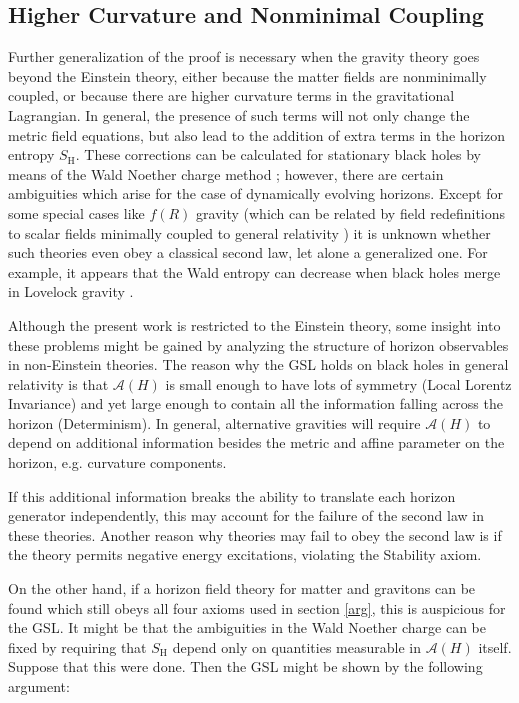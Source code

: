 \documentclass[12pt]{article}
\begin{document}
\subsection{Higher Curvature and Nonminimal Coupling}\label{nonmin}

Further generalization of the proof is necessary when the gravity theory goes beyond the Einstein theory, either because the matter fields are nonminimally coupled, or because there are higher curvature terms in the gravitational Lagrangian.  In general, the presence of such terms will not only change the metric field equations, but also lead to the addition of extra terms in the horizon entropy $S_\mathrm{H}$.  These corrections can be calculated for stationary black holes by means of the Wald Noether charge method \cite{WI94}; however, there are certain ambiguities which arise for the case of dynamically evolving horizons.  Except for some special cases like $f(R)$ gravity (which can be related by field redefinitions to scalar fields minimally coupled to general relativity \cite{2ndlaw}) it is unknown whether such theories even obey a classical second law, let alone a generalized one.  For example, it appears that the Wald entropy can decrease when black holes merge in Lovelock gravity \cite{lovelock}.

Although the present work is restricted to the Einstein theory, some insight into these problems might be gained by analyzing the structure of horizon observables in non-Einstein theories.  The reason why the GSL holds on black holes in general relativity is that $\mathcal{A}(H)$ is small enough to have lots of symmetry (Local Lorentz Invariance) and yet large enough to contain all the information falling across the horizon (Determinism).  In general, alternative gravities will require $\mathcal{A}(H)$ to depend on additional information besides the metric and affine parameter on the horizon, e.g. curvature components.

If this additional information breaks the ability to translate each horizon generator independently, this may account for the failure of the second law in these theories.  Another reason why theories may fail to obey the second law is if the theory permits negative energy excitations, violating the Stability axiom.

On the other hand, if a horizon field theory for matter and gravitons can be found which still obeys all four axioms used in section \ref{arg}, this is auspicious for the GSL.  It might be that the ambiguities in the Wald Noether charge can be fixed by requiring that $S_\mathrm{H}$ depend only on quantities measurable in $\mathcal{A}(H)$ itself.  Suppose that this were done.  Then the GSL might be shown by the following argument:
\end{document}
